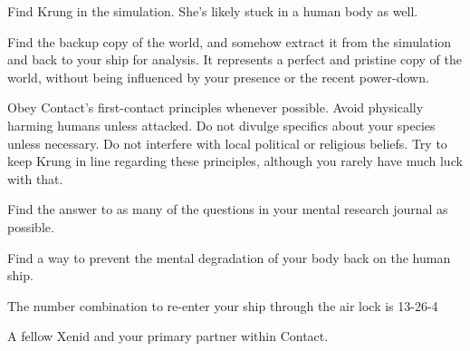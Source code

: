 \documentclass[char]{guildcamp1}
\begin{document}

\begin{itemz}[Goals]
  \item Find Krung in the simulation. She's likely stuck in a human body as well.
  \item Find the backup copy of the world, and somehow extract it from the simulation and back to your ship for analysis. It represents a perfect and pristine copy of the world, without being influenced by your presence or the recent power-down.
  \item Obey Contact's first-contact principles whenever possible. Avoid physically harming humans unless attacked. Do not divulge specifics about your species unless necessary. Do not interfere with local political or religious beliefs. Try to keep Krung in line regarding these principles, although you rarely have much luck with that.
  \item Find the answer to as many of the questions in your mental research journal as possible.
  \item Find a way to prevent the mental degradation of your body back on the human ship.
  
\end{itemz}

\begin{itemz}[Notes]
  \item The number combination to re-enter your ship through the air lock is 13-26-4
\end{itemz}

\begin{contacts}
   A fellow Xenid and your primary partner within Contact.
\end{contacts}



\endtag
\end{document}

